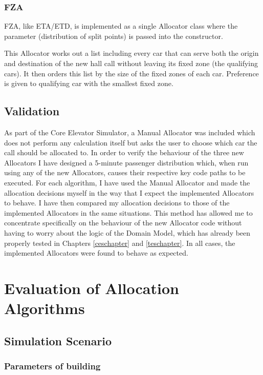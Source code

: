 \documentclass{UoYCSproject}
\begin{document}
\subsection{FZA}

FZA, like ETA/ETD, is implemented as a single Allocator class where the parameter (distribution of split points) is passed into the constructor.

This Allocator works out a list including every car that can serve both the origin and destination of the new hall call without leaving its fixed zone (the qualifying cars).  It then orders this list by the size of the fixed zones of each car.  Preference is given to qualifying car with the smallest fixed zone.

\section{Validation}

As part of the Core Elevator Simulator, a Manual Allocator was included which does not perform any calculation itself but asks the user to choose which car the call should be allocated to.  In order to verify the behaviour of the three new Allocators I have designed a 5-minute passenger distribution which, when run using any of the new Allocators, causes their respective key code paths to be executed.  For each algorithm, I have used the Manual Allocator and made the allocation decisions myself in the way that I expect the implemented Allocators to behave.  I have then compared my allocation decisions to those of the implemented Allocators in the same situations.  This method has allowed me to concentrate specifically on the behaviour of the new Allocator code without having to worry about the logic of the Domain Model, which has already been properly tested in Chapters \ref{ceschapter} and \ref{teschapter}.  In all cases, the implemented Allocators were found to behave as expected.

\chapter{Evaluation of Allocation Algorithms}
\label{algevaluation}

\section{Simulation Scenario}

\subsection{Parameters of building}
\end{document}

